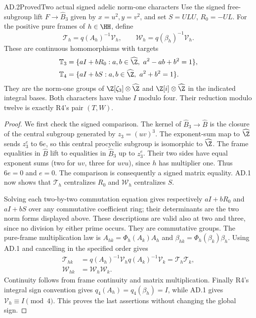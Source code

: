 \begin{statement}{AD.2}{Proved}{Two actual signed adelic norm-one characters}
Use the signed free-subgroup lift $F\to\widehat B_3$ given by
$x=u^2,y=v^2$, and set $S=ULU$, $R_0=-UL$.
For the positive pure frames of $h\in\HH$, define
\[
 \mathcal T_h=q(A_h)^{-1}\mathcal V_h,\qquad
 \mathcal W_h=q(\beta_h)^{-1}\mathcal V_h.
\]
These are continuous homomorphisms with targets
\[
 \begin{split}
 \mathbb T_3&=\{aI+bR_0:a,b\in\widehat\Z,
                       \ a^2-ab+b^2=1\},\\
 \mathbb T_4&=\{aI+bS:a,b\in\widehat\Z,
                       \ a^2+b^2=1\}.
 \end{split}
\]
They are the norm-one groups of
$\Z[\zeta_3]\otimes\widehat\Z$ and
$\Z[i]\otimes\widehat\Z$ in the indicated integral bases.
Both characters have value $I$ modulo four.
Their reduction modulo twelve is exactly R4's pair $(T,W)$.
\end{statement}
\begin{proof}
We first check the signed comparison. The kernel of
$\widehat B_3\to\widehat B$ is the closure of the central
subgroup generated by $z_3=(uv)^3$. The exponent-sum map
to $\widehat\Z$ sends $z_3^e$ to $6e$, so this central
procyclic subgroup is isomorphic to $\widehat\Z$.
The frame equalities in $\widehat B$ lift to equalities in
$\widehat B_3$ up to $z_3^e$. Their two sides have equal
exponent sums (two for $uv$, three for $uvu$), since
$h$ has multiplier one. Thus $6e=0$ and $e=0$.
The comparison is consequently a signed matrix equality.
AD.1 now shows that $\mathcal T_h$ centralizes $R_0$ and
$\mathcal W_h$ centralizes $S$.

Solving each two-by-two commutation equation gives respectively
$aI+bR_0$ and $aI+bS$ over any commutative coefficient ring;
their determinants are the two norm forms displayed above.
These descriptions are valid also at two and three, since
no division by either prime occurs. They are commutative groups.
The pure-frame multiplication law is
$A_{hk}=\Phi_h(A_k)A_h$ and
$\beta_{hk}=\Phi_h(\beta_k)\beta_h$.
Using AD.1 and cancelling in the specified order gives
\[
 \begin{split}
 \mathcal T_{hk}
 &=q(A_h)^{-1}\mathcal V_h q(A_k)^{-1}\mathcal V_k
   =\mathcal T_h\mathcal T_k,\\
 \mathcal W_{hk}&=\mathcal W_h\mathcal W_k.
 \end{split}
\]
Continuity follows from frame continuity and matrix multiplication.
Finally R4's integral sign convention gives
$q_4(A_h)=q_4(\beta_h)=I$, while AD.1 gives
$\mathcal V_h\equiv I\pmod4$. This proves the last assertions
without changing the global sign.
\end{proof}

